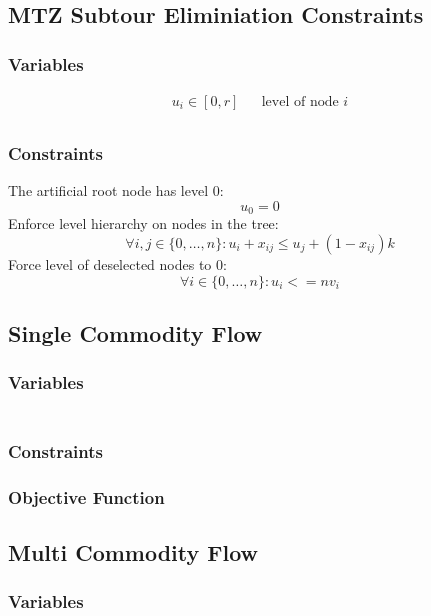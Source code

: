 \documentclass{article}
\begin{document}
\subsection{MTZ Subtour Eliminiation Constraints}
\subsubsection{Variables}
\begin{eqnarray}
u_i \in [0,r]  && \text{level of node $i$} \\
\end{eqnarray}
\subsubsection{Constraints}
The artificial root node has level 0:
\begin{equation}
u_0 = 0
\end{equation}
Enforce level hierarchy on nodes in the tree:
\begin{equation}
\forall i, j \in\{0,\ldots,n\}: u_i + x_{ij} \leq u_j + (1 - x_{ij})k
\end{equation}
Force level of deselected nodes to 0:
\begin{equation}
\forall i \in \{0,\ldots,n\}: u_i <= nv_i
\end{equation}

\subsection{Single Commodity Flow}
\subsubsection{Variables}
\begin{eqnarray}
\end{eqnarray}
\subsubsection{Constraints}
\subsubsection{Objective Function}

\subsection{Multi Commodity Flow}
\subsubsection{Variables}
\begin{eqnarray}
\end{eqnarray}
\end{document}
